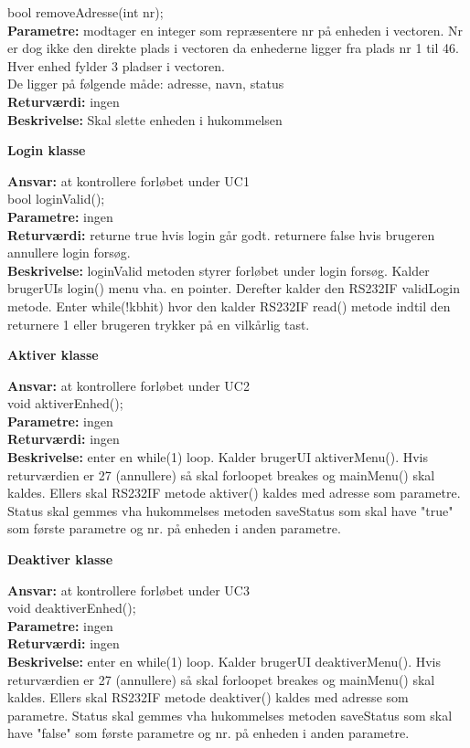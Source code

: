 \newpage

bool removeAdresse(int nr); \\
\textbf{Parametre:} modtager en integer som repræsentere nr på enheden i vectoren. Nr er dog ikke den direkte plads i vectoren da enhederne ligger fra plads nr 1 til 46. Hver enhed fylder 3 pladser i vectoren.  \\
De ligger på følgende måde: adresse, navn, status \\
\textbf{Returværdi:} ingen \\
\textbf{Beskrivelse:} Skal slette enheden i hukommelsen\\

{\centering 
\textbf{Login klasse}\par
}
\textbf{Ansvar:} at kontrollere forløbet under UC1 \\
bool loginValid(); \\
\textbf{Parametre:} ingen  \\
\textbf{Returværdi:} returne true hvis login går godt. returnere false hvis brugeren annullere login forsøg. \\
\textbf{Beskrivelse:} loginValid metoden styrer forløbet under login forsøg. Kalder brugerUIs login() menu vha. en pointer. Derefter kalder den RS232IF validLogin metode. Enter while(!kbhit) hvor den kalder RS232IF read() metode indtil den returnere 1 eller brugeren trykker på en vilkårlig tast. \\

{\centering 
\textbf{Aktiver klasse}\par
}
\textbf{Ansvar:} at kontrollere forløbet under UC2 \\
void aktiverEnhed(); \\
\textbf{Parametre:} ingen \\
\textbf{Returværdi:} ingen \\
\textbf{Beskrivelse:} enter en while(1) loop. Kalder brugerUI aktiverMenu(). Hvis returværdien er 27 (annullere) så skal forloopet breakes og mainMenu() skal kaldes. Ellers skal RS232IF metode aktiver() kaldes med adresse som parametre. Status skal gemmes vha hukommelses metoden saveStatus som skal have "true" som første parametre og nr. på enheden i anden parametre. \\

{\centering 
\textbf{Deaktiver klasse}\par
}
\textbf{Ansvar:} at kontrollere forløbet under UC3 \\

void deaktiverEnhed(); \\
\textbf{Parametre:} ingen \\
\textbf{Returværdi:} ingen \\
\textbf{Beskrivelse:} enter en while(1) loop. Kalder brugerUI deaktiverMenu(). Hvis returværdien er 27 (annullere) så skal forloopet breakes og mainMenu() skal kaldes. Ellers skal RS232IF metode deaktiver() kaldes med adresse som parametre. Status skal gemmes vha hukommelses metoden saveStatus som skal have "false" som første parametre og nr. på enheden i anden parametre. \\

